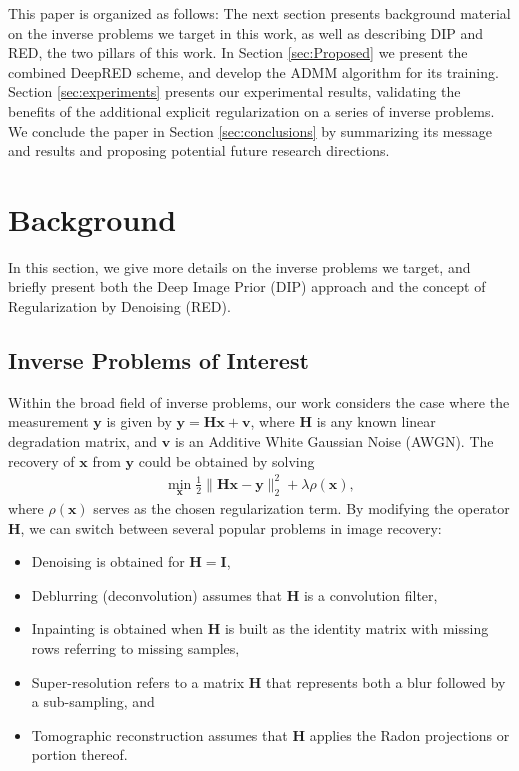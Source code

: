 \documentclass[12pt]{article}
\def\x{{\mathbf x}}
\def\H{{\mathbf H}}
\def\y{{\mathbf y}}
\def\I{{\mathbf I}}
\begin{document}
This paper is organized as follows: The next section presents background material on the inverse problems we target in this work, as well as describing DIP and RED, the two pillars of this work. In Section \ref{sec:Proposed} we present the combined DeepRED scheme, and develop the ADMM algorithm for its training. Section \ref{sec:experiments} presents our experimental results, validating the benefits of the additional explicit regularization on a series of inverse problems. We conclude the paper in Section \ref{sec:conclusions} by summarizing its message and results and proposing potential future research directions. 



\section{Background}
\label{sec:Background}

In this section, we give more details on the inverse problems we target, and briefly present both the Deep Image Prior (DIP) approach and the concept of Regularization by Denoising (RED). 



\subsection{Inverse Problems of Interest}
\label{subsec:IP}

Within the broad field of inverse problems, our work considers the case where the measurement $\y$ is given by 
$\y = \mathbf{H} \x + \mathbf{v}$, where $\mathbf{H}$ is any known linear degradation matrix, and $\mathbf{v}$ is an Additive White Gaussian Noise (AWGN). The recovery of $\x$ from $\y$ could be obtained by solving 
\begin{eqnarray}\label{eq:InverseProblem}
\min_{\x} \frac{1}{2}\| \H\x-\y\|^2_2+\lambda \rho(\x), 
\end{eqnarray}
where $\rho(\x)$ serves as the chosen regularization term. By modifying the operator $\H$, we can switch between several popular problems in image recovery: 
\begin{itemize}
\item Denoising is obtained for $\H=\I$, 
\item Deblurring (deconvolution) assumes that $\H$ is a convolution filter, 
\item Inpainting is obtained when $\H$ is built as the identity matrix with missing rows referring to missing samples, 
\item Super-resolution refers to a matrix $\H$ that represents both a blur followed by a sub-sampling, and 
\item Tomographic reconstruction assumes that $\H$ applies the Radon projections or portion thereof. 
\end{itemize}
\end{document}
